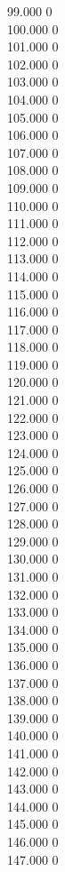 { 99.000	0 \\
 100.000	0 \\
 101.000	0 \\
 102.000	0 \\
 103.000	0 \\
 104.000	0 \\
 105.000	0 \\
 106.000	0 \\
 107.000	0 \\
 108.000	0 \\
 109.000	0 \\
 110.000	0 \\
 111.000	0 \\
 112.000	0 \\
 113.000	0 \\
 114.000	0 \\
 115.000	0 \\
 116.000	0 \\
 117.000	0 \\
 118.000	0 \\
 119.000	0 \\
 120.000	0 \\
 121.000	0 \\
 122.000	0 \\
 123.000	0 \\
 124.000	0 \\
 125.000	0 \\
 126.000	0 \\
 127.000	0 \\
 128.000	0 \\
 129.000	0 \\
 130.000	0 \\
 131.000	0 \\
 132.000	0 \\
 133.000	0 \\
 134.000	0 \\
 135.000	0 \\
 136.000	0 \\
 137.000	0 \\
 138.000	0 \\
 139.000	0 \\
 140.000	0 \\
 141.000	0 \\
 142.000	0 \\
 143.000	0 \\
 144.000	0 \\
 145.000	0 \\
 146.000	0 \\
 147.000	0 \\
}
